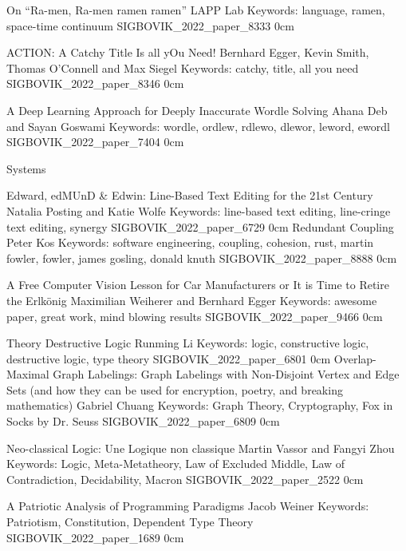 \addpaper
    {On ``Ra-men, Ra-men ramen ramen''}
    {LAPP Lab}
    {Keywords: language, ramen, space-time continuum}
    {SIGBOVIK_2022_paper_8333}
    {0cm}
    {}


\addpaper
    {ACTION: A Catchy Title Is all yOu Need!}
    {Bernhard Egger, Kevin Smith, Thomas O'Connell and Max Siegel}
    {Keywords: catchy, title, all you need}
    {SIGBOVIK_2022_paper_8346}
    {0cm}
    {}


\addpaper
    {A Deep Learning Approach for Deeply Inaccurate Wordle Solving}
    {Ahana Deb and Sayan Goswami}
    {Keywords: wordle, ordlew, rdlewo, dlewor, leword, ewordl}
    {SIGBOVIK_2022_paper_7404}
    {0cm}
    {}


\addtrack
    {}{Systems}

\addpaper
    {Edward, edMUnD \& Edwin: Line-Based Text Editing for the 21st Century}
    {Natalia Posting and Katie Wolfe}
    {Keywords: line-based text editing, line-cringe text editing, synergy}
    {SIGBOVIK_2022_paper_6729}
    {0cm}
    {}
\addpaper
    {Redundant Coupling}
    {Peter Kos}
    {Keywords: software engineering, coupling, cohesion, rust, martin fowler, fowler, james gosling, donald knuth}
    {SIGBOVIK_2022_paper_8888}
    {0cm}
    {}

\addpaper
    {A Free Computer Vision Lesson for Car Manufacturers or It is Time to Retire the Erlkönig}
    {Maximilian Weiherer and Bernhard Egger}
    {Keywords: awesome paper, great work, mind blowing results}
    {SIGBOVIK_2022_paper_9466}
    {0cm}
    {}

\addtrack
    {}{Theory}
\addpaper
    {Destructive Logic}
    {Runming Li}
    {Keywords: logic, constructive logic, destructive logic, type theory}
    {SIGBOVIK_2022_paper_6801}
    {0cm}
    {}
\addpaper
    {Overlap-Maximal Graph Labelings: Graph Labelings with Non-Disjoint Vertex and Edge Sets (and how they can be used for encryption, poetry, and breaking mathematics)}
    {Gabriel Chuang}
    {Keywords: Graph Theory, Cryptography, Fox in Socks by Dr. Seuss}
    {SIGBOVIK_2022_paper_6809}
    {0cm}
    {}


\addpaper
    {Neo-classical Logic: Une Logique non classique}
    {Martin Vassor and Fangyi Zhou}
    {Keywords: Logic, Meta-Metatheory, Law of Excluded Middle, Law of Contradiction, Decidability, Macron}
    {SIGBOVIK_2022_paper_2522}
    {0cm}
    {}


\addpaper
    {A Patriotic Analysis of Programming Paradigms}
    {Jacob Weiner}
    {Keywords: Patriotism, Constitution, Dependent Type Theory}
    {SIGBOVIK_2022_paper_1689}
    {0cm}
    {}



